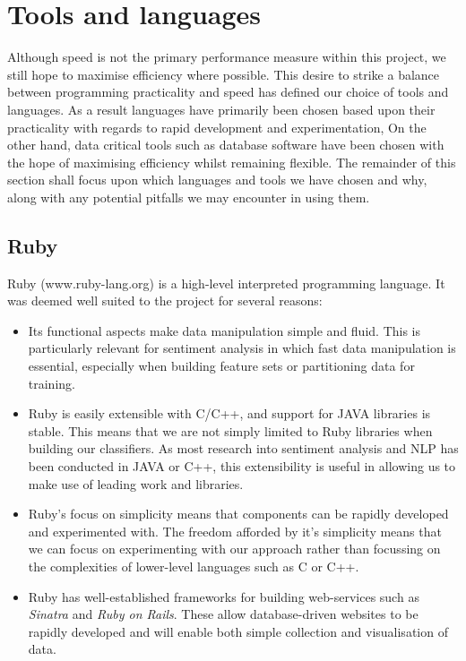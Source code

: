 \section{Tools and languages}
\label{background:tools}

Although speed is not the primary performance measure within this project, we still hope to maximise efficiency where possible. This desire to strike a balance between programming practicality and speed has defined our choice of tools and languages. As a result languages have primarily been chosen based upon their practicality with regards to rapid development and experimentation, On the other hand, data critical tools such as database software have been chosen with the hope of maximising efficiency whilst remaining flexible. The remainder of this section shall focus upon which languages and tools we have chosen and why, along with any potential pitfalls we may encounter in using them.

\subsection{Ruby}

Ruby (www.ruby-lang.org) is a high-level interpreted programming language. It was deemed well suited to the project for several reasons:

\begin{itemize}
	\item Its functional aspects make data manipulation simple and fluid. This is particularly relevant for sentiment analysis in which fast data manipulation is essential, especially when building feature sets or partitioning data for training.
	\item Ruby is easily extensible with C/C++, and support for JAVA libraries is stable. This means that we are not simply limited to Ruby libraries when building our classifiers. As most research into sentiment analysis and NLP has been conducted in JAVA or C++, this extensibility is useful in allowing us to make use of leading work and libraries.
	\item Ruby's focus on simplicity means that components can be rapidly developed and experimented with. The freedom afforded by it's simplicity means that we can focus on experimenting with our approach rather than focussing on the complexities of lower-level languages such as C or C++.
	\item Ruby has well-established frameworks for building web-services such as \emph{Sinatra} and \emph{Ruby on Rails}. These allow database-driven websites to be rapidly developed and will enable both simple collection and visualisation of data.
\end{itemize}

